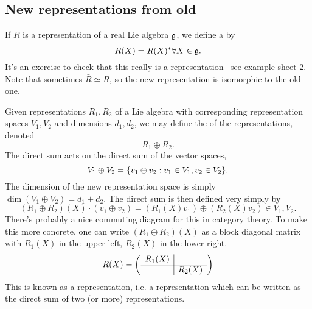 \subsection*{New representations from old} 
\begin{defn}
If $R$ is a representation of a real Lie algebra $\mathfrak{g}$, we define a  by
$$\bar R(X)=R(X)^* \forall X\in \mathfrak{g}.$$
It's an exercise to check that this really is a representation-- see example sheet 2. Note that sometimes $\bar R \simeq R$, so the new representation is isomorphic to the old one.
\end{defn}
\begin{defn}
Given representations $R_1,R_2$ of a Lie algebra with corresponding representation spaces $V_1,V_2$ and dimensions $d_1,d_2$, we may define the  of the representations, denoted
$$R_1 \oplus R_2.$$
The direct sum acts on the direct sum of the vector spaces, $$V_1 \oplus V_2 = \{v_1 \oplus v_2: v_1 \in V_1,
v_2 \in V_2\}.$$ The dimension of the new representation space is simply $\dim(V_1 \oplus V_2)=d_1 +d_2.$ The direct sum is then defined very simply by
$$(R_1 \oplus R_2)(X)\cdot (v_1 \oplus v_2)=(R_1(X)v_1)\oplus (R_2(X)v_2) \in V_1,V_2.$$
There's probably a nice commuting diagram for this in category theory. To make this more concrete, one can write $(R_1\oplus R_2)(X)$ as a block diagonal matrix with $R_1(X)$ in the upper left, $R_2(X)$ in the lower right. 
$$
R(X)=
\left(
\begin{array}{c|c}
R_1(X) & \\
\hline
 & R_2(X)
\end{array}
\right)
$$
This is known as a  representation, i.e. a representation which can be written as the direct sum of two (or more) representations.
\end{defn}

